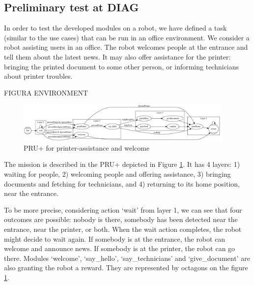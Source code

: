 \subsection{Preliminary test at DIAG}

In order to test the developed modules on a robot, we have defined a task (similar to the \coaches use cases) that can be run in an office environment.
We consider a robot assisting users in an office. The robot welcomes people at the entrance and tell them about the latest news. It may also offer assistance for the printer: bringing the printed document to some other person, or informing technicians about printer troubles.

FIGURA ENVIRONMENT


\begin{figure}
\centering
\includegraphics[width=0.95\textwidth]{fig/PRU}
\caption{PRU+ for printer-assistance and welcome}
\label{fig:pru}
\end{figure}

The mission is described in the PRU+ depicted in Figure \ref{fig:pru}. It has 4 layers: 1) waiting for people, 2) welcoming people and offering assistance, 3) bringing documents and fetching for technicians, and 4) returning to its home position, near the entrance.

To be more precise, considering action `wait' from layer 1, we can see that four outcomes are possible: nobody is there, somebody has been detected near the entrance, near the printer, or both. When the wait action completes, the robot might decide to wait again. If somebody is at the entrance, the robot can welcome and announce news. If somebody is at the printer, the robot can go there.
Modules `welcome', `say\_hello', `say\_technicians' and `give\_document' are also granting the robot a reward. They are represented by octagons on the figure  \ref{fig:pru}.

